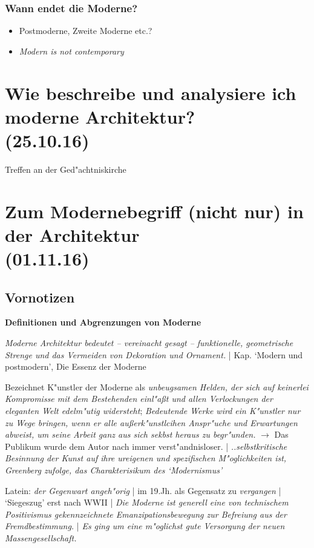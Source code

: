 \documentclass[emulatestandardclasses]{scrartcl}
\begin{document}
\subsubsection{Wann endet die Moderne?}

\begin{itemize}
    \item Postmoderne, Zweite Moderne etc.?
    \item \emph{Modern is not contemporary}
\end{itemize}

\section{Wie beschreibe und analysiere ich moderne Architektur?\\(25.10.16)}

Treffen an der Ged"achtniskirche


\section{Zum Modernebegriff (nicht nur) in der Architektur\\(01.11.16)}

\subsection{Vornotizen}
\textbf{Definitionen und Abgrenzungen von Moderne}

\begin{description}[leftmargin=!,labelwidth=\widthof{\bfseries P2}]
  \item[Greenberg (Arch.)] \emph{Moderne Architektur bedeutet -- vereinacht gesagt -- funktionelle, geometrische Strenge und das Vermeiden von Dekoration und Ornament.} | Kap. `Modern und postmodern', Die Essenz der Moderne 
  \item[Greenberg (Kunst)] Bezeichnet K"unstler der Moderne als \emph{unbeugsamen Helden, der sich auf keinerlei Kompromisse mit dem Bestehenden einl"a\ss t und allen Verlockungen der eleganten Welt edelm"utig widersteht}; \emph{Bedeutende Werke wird ein K"unstler nur zu Wege bringen, wenn er alle au\ss erk"unstlcihen Anspr"uche und Erwartungen abweist, um seine Arbeit ganz aus sich sekbst heraus zu begr"unden.} $\rightarrow$ Das Publikum wurde dem Autor nach immer verst"andnisloser. | \emph{..selbstkritische Besinnung der Kunst auf ihre ureigenen und spezifischen M"oglichkeiten ist, Greenberg zufolge, das Charakterisikum des `Modernismus' }
  
  \item[Kretschmer] Latein: \emph{der Gegenwart angeh"orig} | im 19.Jh. als Gegensatz zu \emph{vergangen} | `Siegeszug' erst nach WWII | \emph{Die Moderne ist generell eine von technischem Positivismus gekennzeichnete Emanzipationsbewegung zur Befreiung aus der Fremdbestimmung.} | \emph{Es ging um eine m"oglichst gute Versorgung der neuen Massengesellschaft.} 
\end{description}
\end{document}
